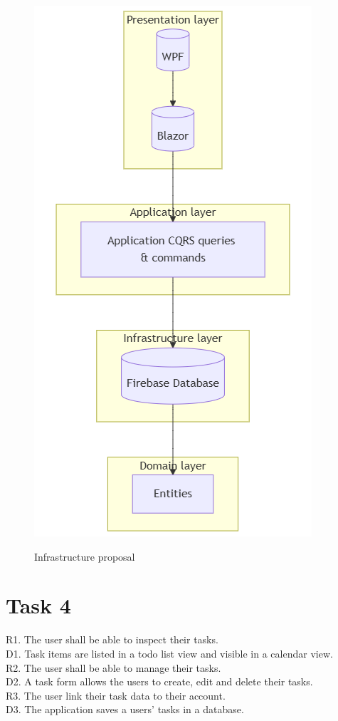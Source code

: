 \documentclass{article}
\begin{document}
\begin{figure}[t!]
  \includegraphics{images/infrastructure-proposal.png}
  \label{Infrastructure proposal}
  \caption{Infrastructure proposal}
\end{figure}
\clearpage

\section{Task 4}

R1. The user shall be able to inspect their tasks.\\
D1. Task items are listed in a todo list view and visible in a calendar view.
\\[1em]
R2. The user shall be able to manage their tasks.\\
D2. A task form allows the users to create, edit and delete their tasks.
\\[1em]
R3. The user link their task data to their account.\\
D3. The application saves a users' tasks in a database.\\
\end{document}
